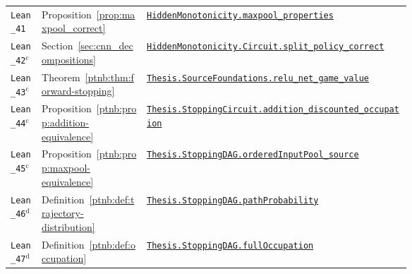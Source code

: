 {\begin{longtable}{@{}l l >{\raggedright\arraybackslash}p{0.66\linewidth}@{}}
\texttt{Lean\_41} & Proposition~\ref{prop:maxpool_correct} & \href{https://github.com/JayPiZimmermann/A-Structural-Approach-to-Explainable-Deep-Learning/blob/b1c18a7ed02eadd720b0b693794ba7e7dd2628f6/formalization/HiddenMonotonicity/MaxPool.lean\#L61}{\texttt{HiddenMonotonicity.\allowbreak maxpool\_properties}} \\
\texttt{Lean\_42}$^{\mathrm c}$ & Section~\ref{sec:cnn_decompositions} & \href{https://github.com/JayPiZimmermann/A-Structural-Approach-to-Explainable-Deep-Learning/blob/b1c18a7ed02eadd720b0b693794ba7e7dd2628f6/formalization/HiddenMonotonicity/PoolingCircuit.lean\#L81}{\texttt{HiddenMonotonicity.\allowbreak Circuit.\allowbreak split\_policy\_correct}} \\
\texttt{Lean\_43}$^{\mathrm c}$ & Theorem~\ref{ptnb:thm:forward-stopping} & \href{https://github.com/JayPiZimmermann/A-Structural-Approach-to-Explainable-Deep-Learning/blob/b1c18a7ed02eadd720b0b693794ba7e7dd2628f6/formalization/Thesis/SourceFoundationsStatements.lean\#L228}{\texttt{Thesis.\allowbreak SourceFoundations.\allowbreak relu\_net\_game\_value}} \\
\texttt{Lean\_44}$^{\mathrm c}$ & Proposition~\ref{ptnb:prop:addition-equivalence} & \href{https://github.com/JayPiZimmermann/A-Structural-Approach-to-Explainable-Deep-Learning/blob/b1c18a7ed02eadd720b0b693794ba7e7dd2628f6/formalization/Thesis/StoppingCircuit.lean\#L105}{\texttt{Thesis.\allowbreak StoppingCircuit.\allowbreak addition\_discounted\_occupation}} \\
\texttt{Lean\_45}$^{\mathrm c}$ & Proposition~\ref{ptnb:prop:maxpool-equivalence} & \href{https://github.com/JayPiZimmermann/A-Structural-Approach-to-Explainable-Deep-Learning/blob/b1c18a7ed02eadd720b0b693794ba7e7dd2628f6/formalization/Thesis/StoppingOrderedPool.lean\#L146}{\texttt{Thesis.\allowbreak StoppingDAG.\allowbreak orderedInputPool\_source}} \\
\texttt{Lean\_46}$^{\mathrm d}$ & Definition~\ref{ptnb:def:trajectory-distribution} & \href{https://github.com/JayPiZimmermann/A-Structural-Approach-to-Explainable-Deep-Learning/blob/b1c18a7ed02eadd720b0b693794ba7e7dd2628f6/formalization/Thesis/StoppingDAGPaths.lean\#L65}{\texttt{Thesis.\allowbreak StoppingDAG.\allowbreak pathProbability}} \\
\texttt{Lean\_47}$^{\mathrm d}$ & Definition~\ref{ptnb:def:occupation} & \href{https://github.com/JayPiZimmermann/A-Structural-Approach-to-Explainable-Deep-Learning/blob/b1c18a7ed02eadd720b0b693794ba7e7dd2628f6/formalization/Thesis/StoppingDAGVisits.lean\#L28}{\texttt{Thesis.\allowbreak StoppingDAG.\allowbreak fullOccupation}} \\

\end{longtable}}
